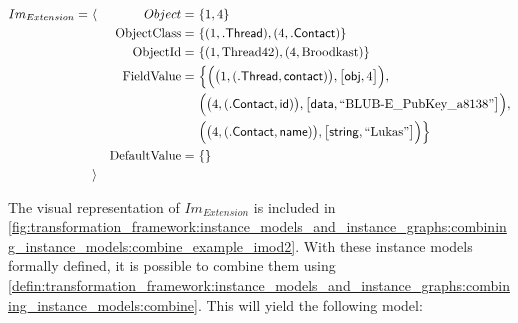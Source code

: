 \begin{align*}
Im_{Extension} =\ &\langle&
Object =\ &\{ 1, 4 \} \\&&
\mathrm{ObjectClass} =\ &\{
( 1, \mathsf{.Thread} ),
( 4, \mathsf{.Contact} )
\} \\&&
\mathrm{ObjectId} =\ &\{
( 1, \text{Thread42} ),
( 4, \text{Broodkast} )
\} \\&&
\mathrm{FieldValue} =\ &\Big\{
\Big( \big( 1, ( \mathsf{.Thread}, \mathsf{contact} ) \big), \big[ \mathsf{obj}, 4 \big] \Big),\\&&&
\Big( \big( 4, ( \mathsf{.Contact}, \mathsf{id} ) \big), \big[ \mathsf{data}, \text{``BLUB-E\_PubKey\_a8138''} \big] \Big),\\&&&
\Big( \big( 4, ( \mathsf{.Contact}, \mathsf{name} ) \big), \big[ \mathsf{string}, \text{``Lukas''} \big] \Big)
\Big\} \\&&
\mathrm{DefaultValue} =\ &\{\}
\\&\rangle
\end{align*}

The visual representation of $Im_{Extension}$ is included in \cref{fig:transformation_framework:instance_models_and_instance_graphs:combining_instance_models:combine_example_imod2}. With these instance models formally defined, it is possible to combine them using \cref{defin:transformation_framework:instance_models_and_instance_graphs:combining_instance_models:combine}. This will yield the following model:

